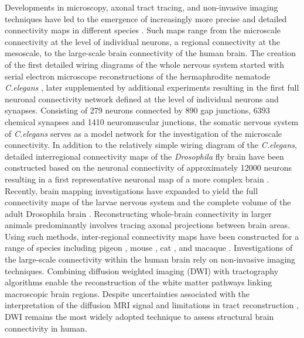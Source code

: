 Developments in microscopy, axonal tract tracing, and non-invasive imaging techniques have led to the emergence of increasingly more precise and detailed connectivity maps in different species \citep{Bota2015,Chiang2011a,Oh2014,Scannell1999,Shanahan2013,Stephan2001,VanEssen2013,White1986}. Such maps range from the microscale connectivity at the level of individual neurons, a regional connectivity at the mesoscale, to the large-scale brain connectivity of the human brain. The creation of the first detailed wiring diagrams of the whole nervous system started with serial electron microscope reconstructions of the hermaphrodite nematode \textit{C.elegans} \citep{White1986}, later supplemented by additional experiments \mbox{\citep{Varshney2011}} resulting in the first full neuronal connectivity network defined at the level of individual neurons and synapses. Consisting of 279 neurons connected by 890 gap junctions, 6393 chemical synapses and 1410 neuromuscular junctions, the somatic nervous system of \textit{C.elegans} serves as a model network for the investigation of the microscale connectivity. In addition to the relatively simple wiring diagram of the \textit{C.elegans}, detailed interregional connectivity maps of the \textit{Drosophila} fly brain have been constructed based on the neuronal connectivity of approximately \num{12000} neurons resulting in a first representative neuronal map of a more complex brain \mbox{\citep{Chiang2011a}}. Recently, brain mapping investigations have expanded to yield the full connectivity maps of the larvae nervous system \citep{Ohyama2015} and the complete volume of the adult Drosophila brain \mbox{\citep{Zheng2018}}. Reconstructing whole-brain connectivity in larger animals predominantly involves tracing axonal projections between brain areas. Using such methods, inter-regional connectivity maps have been constructed for a range of species including pigeon \mbox{\citep{Shanahan2013}}, mouse \mbox{\citep{Oh2014}}, cat \mbox{\citep{Scannell1995}}, and macaque \mbox{\citep{Harriger2012}}. Investigations of the large-scale connectivity within the human brain rely on non-invasive imaging techniques. Combining diffusion weighted imaging (DWI) with tractography algorithms \mbox{\citep{Jbabdi2011}} enable the reconstruction of the white matter pathways linking macroscopic brain regions. Despite uncertainties associated with the interpretation of the diffusion MRI signal and limitations in tract reconstruction \mbox{\citep{Jones2010,Jones2013,Thomas2014}}, DWI remains the most widely adopted technique to assess structural brain connectivity in human.

